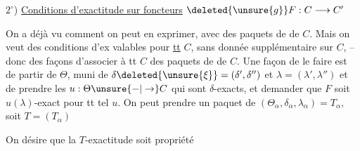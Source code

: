 $2^\circ$) \uline{Conditions d'exactitude sur foncteurs} $\deleted{\unsure{g}}F:C\longrightarrow C'$

On a déjà vu comment on peut en exprimer, avec des paquets de  de $C$. Mais on veut des conditions  d'ex valables pour \uline{tt} $C$, sans donnée supplémentaire sur $C$, -- donc des façons d'associer à tt $C$ des paquets de  de $C$. Une façon de le faire est de partir de $\Theta$, muni de $\delta\deleted{\unsure{\xi}}=(\delta',\delta'')$ et $\lambda=(\lambda',\lambda'')$  et de prendre les $u:\Theta\unsure{-|\to}C$ qui sont $\delta$-exacts, et demander que $F$ soit $u(\lambda)$-exact pour tt tel $u$. On peut prendre un paquet de  $(\Theta_\alpha,\delta_\alpha,\lambda_\alpha)=T_\alpha$, soit $T=(T_\alpha)$

On désire que  la $T$-exactitude soit propriété


